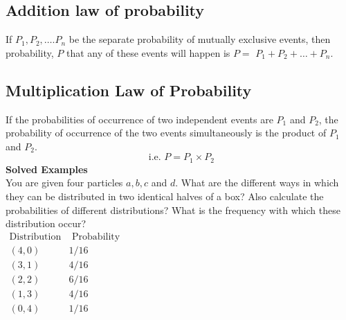 \subsection{Addition law of probability}
If $P_{1}, P_{2}, \ldots . P_{n}$ be the separate probability of mutually exclusive events, then probability, $P$ that any of these events will happen is $P=$ $P_{1}+P_{2}+\ldots+P_{n}$.\\
\subsection{Multiplication Law of Probability}
If the probabilities of occurrence of two independent events are $P_{1}$ and $P_{2}$, the probability of occurrence of the two events simultaneously is the product of $P_{1}$ and $P_{2}$.
$$\text { i.e. } P=P_{1} \times P_{2}$$
\textbf{Solved Examples}\\
You are given four particles $a, b, c$ and $d$. What are the different ways in which they can be distributed in two identical halves of a box? Also calculate the probabilities of different distributions? What is the frequency with which these distribution occur?\\
$\begin{array}{ll}\text{Distribution}&\text{ Probability }\\(4,0) & 1 / 16 \\ (3,1) & 4 / 16 \\ (2,2) & 6 / 16 \\ (1,3) & 4 / 16 \\ (0,4) & 1 / 16\end{array}$\\

